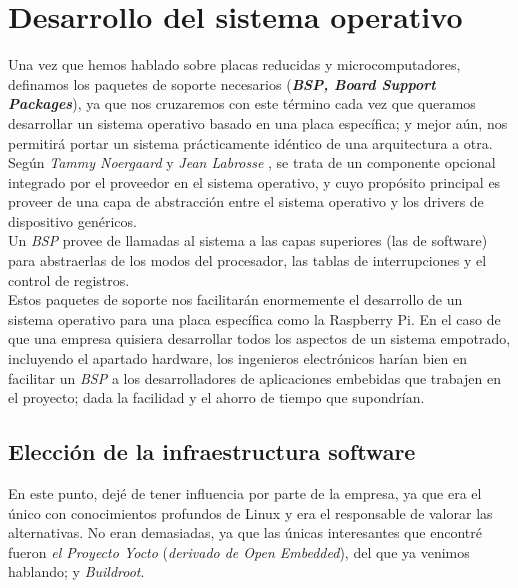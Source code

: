 \section{Desarrollo del sistema operativo}

Una vez que hemos hablado sobre placas reducidas y microcomputadores, definamos los paquetes de soporte necesarios (\textbf{\textit{BSP, Board Support Packages}}), ya que nos cruzaremos con este término cada vez que queramos desarrollar un sistema operativo basado en una placa específica; y mejor aún, nos permitirá portar un sistema prácticamente idéntico de una arquitectura a otra.\\

Según \textit{Tammy Noergaard} y \textit{Jean Labrosse} \cite{embedded-software-know-it-all-bsp}, se trata de un componente opcional integrado por el proveedor en el sistema operativo, y cuyo propósito principal es proveer de una capa de abstracción entre el sistema operativo y los drivers de dispositivo genéricos.\\

Un \textit{BSP} provee de llamadas al sistema a las capas superiores (las de software) para abstraerlas de los modos del procesador, las tablas de interrupciones y el control de registros.\\

Estos paquetes de soporte nos facilitarán enormemente el desarrollo de un sistema operativo para una placa específica como la Raspberry Pi. En el caso de que una empresa quisiera desarrollar todos los aspectos de un sistema empotrado, incluyendo el apartado hardware, los ingenieros electrónicos harían bien en facilitar un \textit{BSP} a los desarrolladores de aplicaciones embebidas que trabajen en el proyecto; dada la facilidad y el ahorro de tiempo que supondrían.\\

\subsection{Elección de la infraestructura software}

En este punto, dejé de tener influencia por parte de la empresa, ya que era el único con conocimientos profundos de Linux y era el responsable de valorar las alternativas. No eran demasiadas, ya que las únicas interesantes que encontré fueron \textit{el Proyecto Yocto} (\textit{derivado de Open Embedded}), del que ya venimos hablando; y \textit{Buildroot}.\\

